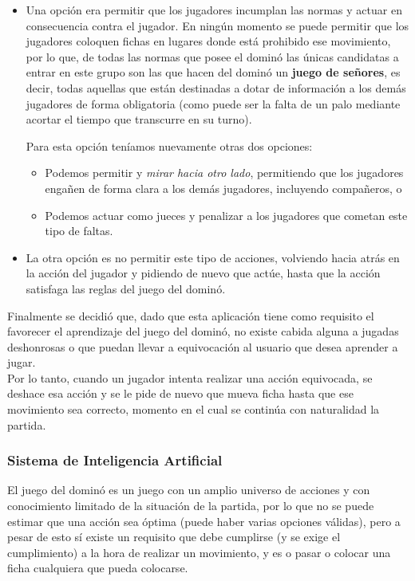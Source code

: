 \begin{itemize}
    \item Una opción era permitir que los jugadores incumplan las normas y actuar en consecuencia contra el jugador.
            En ningún momento se puede permitir que los jugadores coloquen fichas en lugares donde está prohibido
            ese movimiento, por lo que, de todas las normas que posee el dominó las únicas candidatas a entrar en este
            grupo son las que hacen del dominó un \textbf{juego de señores}, es decir, todas aquellas que están destinadas
            a dotar de información a los demás jugadores de forma obligatoria (como puede ser la falta de un palo mediante
            acortar el tiempo que transcurre en su turno).

            Para esta opción teníamos nuevamente otras dos opciones:
            \begin{itemize}
                \item Podemos permitir y \emph{mirar hacia otro lado}, permitiendo que los jugadores engañen de forma
                        clara a los demás jugadores, incluyendo compañeros, o
                \item Podemos actuar como jueces y penalizar a los jugadores que cometan este tipo de faltas.
            \end{itemize}
    \item La otra opción es no permitir este tipo de acciones, volviendo hacia atrás en la acción del jugador y
            pidiendo de nuevo que actúe, hasta que la acción satisfaga las reglas del juego del dominó.
\end{itemize}

Finalmente se decidió que, dado que esta aplicación tiene como requisito el favorecer el aprendizaje del juego del dominó,
no existe cabida alguna a jugadas deshonrosas o que puedan llevar a equivocación al usuario que desea aprender a jugar. \\

Por lo tanto, cuando un jugador intenta realizar una acción equivocada, se deshace esa acción y se le pide de nuevo que
mueva ficha hasta que ese movimiento sea correcto, momento en el cual se continúa con naturalidad la partida.


\subsubsection{Sistema de Inteligencia Artificial}

El juego del dominó es un juego con un amplio universo de acciones y con conocimiento limitado de la situación de la partida,
por lo que no se puede estimar que una acción sea óptima (puede haber varias opciones válidas), pero a pesar de esto sí existe
un requisito que debe cumplirse (y se exige el cumplimiento) a la hora de realizar un movimiento, y es o pasar o colocar una
ficha cualquiera que pueda colocarse. \\

